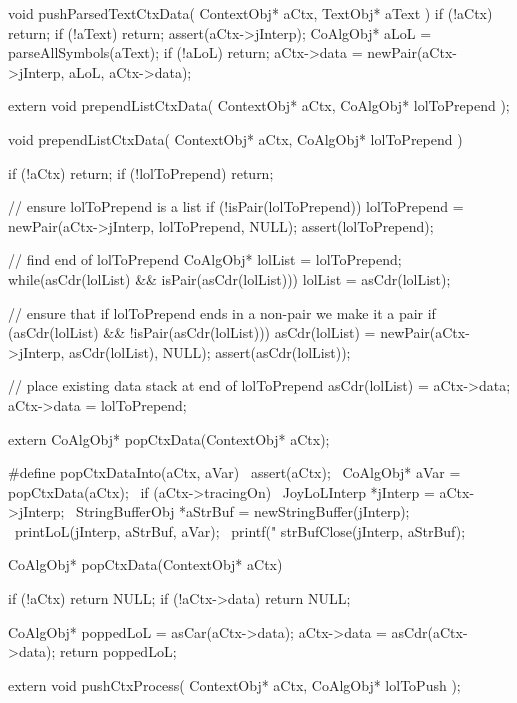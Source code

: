 \startCCode
void pushParsedTextCtxData(
  ContextObj* aCtx,
  TextObj* aText
) {
  if (!aCtx) return;
  if (!aText) return;
  assert(aCtx->jInterp);
  CoAlgObj* aLoL = parseAllSymbols(aText);
  if (!aLoL) return;
  aCtx->data = newPair(aCtx->jInterp, aLoL, aCtx->data);
}
\stopCCode

\startCHeader
extern void prependListCtxData(
  ContextObj* aCtx,
  CoAlgObj* lolToPrepend
);
\stopCHeader

\startCCode
void prependListCtxData(
  ContextObj* aCtx,
  CoAlgObj* lolToPrepend
) {
  if (!aCtx) return;
  if (!lolToPrepend) return;

  // ensure lolToPrepend is a list
  if (!isPair(lolToPrepend)) {
    lolToPrepend = newPair(aCtx->jInterp, lolToPrepend, NULL);
    assert(lolToPrepend);
  }

  // find end of lolToPrepend
  CoAlgObj* lolList = lolToPrepend;
  while(asCdr(lolList) && isPair(asCdr(lolList))) {
    lolList = asCdr(lolList);
  }

  // ensure that if lolToPrepend ends in a non-pair we make it a pair
  if (asCdr(lolList) && !isPair(asCdr(lolList))) {
    asCdr(lolList) = newPair(aCtx->jInterp, asCdr(lolList), NULL);
    assert(asCdr(lolList));
  }

  // place existing data stack at end of lolToPrepend
  asCdr(lolList) = aCtx->data;
  aCtx->data     = lolToPrepend;
}
\stopCCode

\startCHeader
extern CoAlgObj* popCtxData(ContextObj* aCtx);

#define popCtxDataInto(aCtx, aVar)                          \
assert(aCtx);                                               \
CoAlgObj* aVar = popCtxData(aCtx);                          \
if (aCtx->tracingOn) {                                      \
  JoyLoLInterp *jInterp = aCtx->jInterp;                    \
  StringBufferObj *aStrBuf = newStringBuffer(jInterp);      \
  printLoL(jInterp, aStrBuf, aVar);                         \
  printf("%
  strBufClose(jInterp, aStrBuf);                            \
}
\stopCHeader

\startCCode
CoAlgObj* popCtxData(ContextObj* aCtx) {
  if (!aCtx) return NULL;
  if (!aCtx->data) return NULL;

  CoAlgObj* poppedLoL = asCar(aCtx->data);
  aCtx->data          = asCdr(aCtx->data);
  return poppedLoL;
}
\stopCCode

\startCHeader
extern void pushCtxProcess(
  ContextObj* aCtx,
  CoAlgObj* lolToPush
);
\stopCHeader

